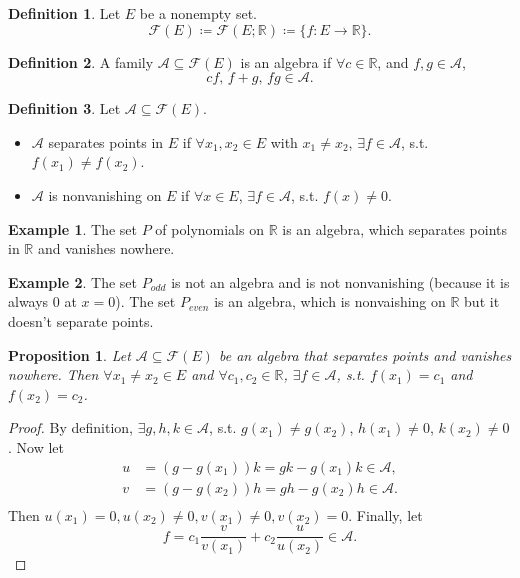 \documentclass[12pt]{article}
\theoremstyle{plain}
\newtheorem*{prop}{Proposition}
\theoremstyle{definition}
\newtheorem*{defn}{Definition}
\newtheorem*{eg}{Example}
\begin{document}
\begin{defn}
    Let $E$ be a nonempty set.
    $$\mathcal{F}(E)\coloneqq\mathcal{F}(E;\mathbb{R})\coloneqq\{f:E\rightarrow\mathbb{R}\}.$$
\end{defn}
\begin{defn}
    A family $\mathcal{A}\subseteq\mathcal{F}(E)$ is an algebra if
    $\forall c\in\mathbb{R}$, and $f,g\in\mathcal{A}$,
    $$cf,\,f+g,\,fg\in\mathcal{A}.$$
\end{defn}
\begin{defn}
    Let $\mathcal{A}\subseteq \mathcal{F}(E)$.
    \begin{itemize}
        \item
        $\mathcal{A}$ separates points in $E$ if $\forall x_1,x_2\in E$ with $x_1\neq x_2$,
        $\exists f\in\mathcal{A}$, s.t. $f(x_1)\neq f(x_2)$.
        \item
        $\mathcal{A}$ is nonvanishing on $E$ if $\forall x\in E$, $\exists
        f\in\mathcal{A}$, s.t. $f(x)\neq0$.
    \end{itemize}
\end{defn}

\begin{eg}
    The set $P$ of polynomials on $\mathbb{R}$ is an algebra, which separates
    points in $\mathbb{R}$ and vanishes nowhere.
\end{eg}
\begin{eg}
    The set $P_{odd}$ is not an algebra and is not nonvanishing (because it is
    always $0$ at $x=0$).
    The set $P_{even}$ is an algebra, which is nonvaishing on $\mathbb{R}$ but
    it doesn't separate points.
\end{eg}

\begin{prop}
    Let $\mathcal{A}\subseteq\mathcal{F}(E)$ be an algebra that separates points
    and vanishes nowhere.
    Then $\forall x_1\neq x_2\in E$ and $\forall c_1,c_2\in\mathbb{R}$,
    $\exists f\in\mathcal{A}$, s.t. $f(x_1)=c_1$ and $f(x_2)=c_2$.
\end{prop}
\begin{proof}
    By definition, $\exists g,h,k\in\mathcal{A}$, s.t.
    $g(x_1)\neq g(x_2)$, $h(x_1)\neq0$, $k(x_2)\neq0$.
    Now let
    $$\begin{aligned}
        u&=(g-g(x_1))k=gk-g(x_1)k\in\mathcal{A},\\
        v&=(g-g(x_2))h=gh-g(x_2)h\in\mathcal{A}.\\
    \end{aligned}$$
    Then
    $u(x_1)=0, u(x_2)\neq 0, v(x_1)\neq0, v(x_2)=0$.
    Finally, let
    $$f=c_1\frac{v}{v(x_1)}+c_2\frac{u}{u(x_2)}\in\mathcal{A}.$$
\end{proof}
\end{document}
